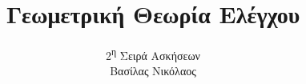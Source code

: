 \documentclass[a4paper,11pt]{article}
\begin{document}
\title{Γεωμετρική Θεωρία Ελέγχου}
\author{2\textsuperscript{η} Σειρά Ασκήσεων\\Βασίλας Νικόλαος}
\maketitle





\end{document}
